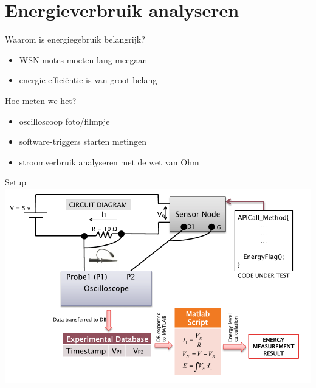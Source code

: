 \documentclass[presentation, bigger]{beamer}
\begin{document}
\section{Energieverbruik analyseren}
\label{sec-3}

\begin{frame}[label=sec-3-1]{Waarom is energiegebruik belangrijk?}
\begin{itemize}
\item WSN-motes moeten lang meegaan
\item energie-efficiëntie is van groot belang
\end{itemize}
\end{frame}

\begin{frame}[label=sec-3-2]{Hoe meten we het?}
\begin{itemize}
\item oscilloscoop
foto/filmpje
\item software-triggers starten metingen
\item stroomverbruik analyseren met de wet van Ohm
\end{itemize}
\end{frame}

\begin{frame}[label=sec-3-3]{Setup}
\includegraphics[width=\textwidth,keepaspectration=true]{energy_measurement_diagram}
\end{frame}
\end{document}
